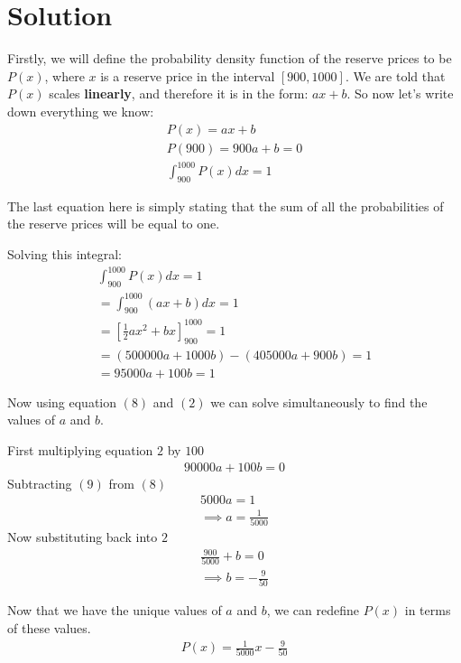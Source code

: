 \documentclass{article}
\begin{document}
\section*{Solution}
\indent Firstly, we will define the probability density function of the reserve prices to be 
$P(x)$, where $x$ is a reserve price in the interval $[900, 1000]$. We are told that $P(x)$
scales \textbf{linearly}, and therefore it is in the form: $ax + b$. So now let's write down
everything we know:
\setlength{\jot}{15pt} %
\begin{gather}
    P(x) = ax + b \\
    P(900) = 900a + b = 0 \\
    \int_{900}^{1000}P(x)dx = 1
\end{gather}

The last equation here is simply stating that the sum of all the probabilities of the reserve 
prices will be equal to one.

Solving this integral:
\begin{gather}
    \int_{900}^{1000}P(x)dx = 1 \\
    = \int_{900}^{1000}(ax+b)dx = 1 \\
    = \left[\frac{1}{2}ax^2 + bx\right]_{900}^{1000} = 1 \\
    = (500000a + 1000b) - (405000a + 900b) = 1 \\
    = 95000a + 100b = 1
\end{gather}

Now using equation $(8)$ and $(2)$ we can solve simultaneously to find the values of $a$ and $b$.

First multiplying equation $2$ by $100$
\begin{gather}
    90000a + 100b = 0
\end{gather}
Subtracting $(9)$ from $(8)$
\begin{gather}
    5000a = 1 \\
    \implies a = \frac{1}{5000}
\end{gather}
Now substituting back into $2$
\begin{gather}
    \frac{900}{5000} + b = 0 \\
    \implies b = -\frac{9}{50} 
\end{gather}

Now that we have the unique values of $a$ and $b$, we can redefine $P(x)$ in terms of these values.
\begin{gather}
    P(x) = \frac{1}{5000}x - \frac{9}{50}
\end{gather}
\end{document}

